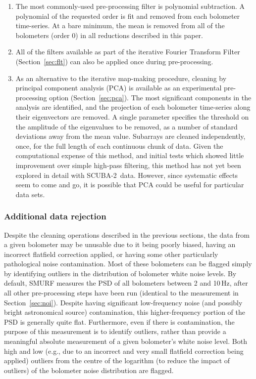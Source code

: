 \documentclass[useAMS,usenatbib,nofootinbib]{mn2e}
\newcommand{\scuba}{SCUBA-2}
\begin{document}
\begin{enumerate}

\item The most commonly-used pre-processing filter is polynomial
subtraction. A polynomial of the requested order is fit and removed
from each bolometer time-series. At a bare minimum, the mean is
removed from all of the bolometers (order 0) in all reductions
described in this paper.

\item All of the filters available as part of the iterative Fourier
Transform Filter (Section~\ref{sec:flt}) can also be applied once
during pre-processing.

\item As an alternative to the iterative map-making procedure,
cleaning by principal component analysis (PCA) is available as an
experimental pre-processing option (Section~\ref{sec:pca}). The most
significant components in the analysis are identified, and the
projection of each bolometer time-series along their eigenvectors are
removed. A single parameter specifies the threshold on the amplitude
of the eigenvalues to be removed, as a number of standard deviations
away from the mean value. Subarrays are cleaned independently, once,
for the full length of each continuous chunk of data. Given the
computational expense of this method, and initial tests which showed
little improvement over simple high-pass filtering, this method has
not yet been explored in detail with \scuba\ data. However, since
systematic effects seem to come and go, it is possible that PCA could
be useful for particular data sets.

\end{enumerate}

\subsubsection{Additional data rejection}
\label{sec:flagbadbol}

Despite the cleaning operations described in the previous sections,
the data from a given bolometer may be unusable due to it being poorly
biased, having an incorrect flatfield correction applied, or having
some other particularly pathological noise contamination. Most of
these bolometers can be flagged simply by identifying outliers in the
distribution of bolometer white noise levels. By default, SMURF
measures the PSD of all bolometers between 2 and 10\,Hz, after all
other pre-processing steps have been run (identical to the measurement
in Section~\ref{sec:noi}). Despite having significant low-frequency
noise (and possibly bright astronomical source) contamination, this
higher-frequency portion of the PSD is generally quite
flat. Furthermore, even if there is contamination, the purpose of this
measurement is to identify outliers, rather than provide a meaningful
absolute measurement of a given bolometer's white noise level. Both
high and low (e.g., due to an incorrect and very small flatfield
correction being applied) outliers from the centre of the logarithm
(to reduce the impact of outliers) of the bolometer noise distribution
are flagged.
\end{document}
